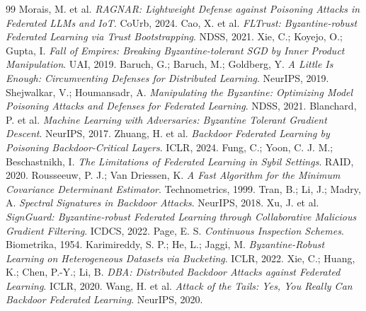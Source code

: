 \documentclass[11pt,a4paper]{article}
\begin{document}
\begin{thebibliography}{99}
 Morais, M. et al. \textit{RAGNAR: Lightweight Defense against Poisoning Attacks in Federated LLMs and IoT}. CoUrb, 2024.
 Cao, X. et al. \textit{FLTrust: Byzantine-robust Federated Learning via Trust Bootstrapping}. NDSS, 2021.
 Xie, C.; Koyejo, O.; Gupta, I. \textit{Fall of Empires: Breaking Byzantine-tolerant SGD by Inner Product Manipulation}. UAI, 2019.
 Baruch, G.; Baruch, M.; Goldberg, Y. \textit{A Little Is Enough: Circumventing Defenses for Distributed Learning}. NeurIPS, 2019.
 Shejwalkar, V.; Houmansadr, A. \textit{Manipulating the Byzantine: Optimizing Model Poisoning Attacks and Defenses for Federated Learning}. NDSS, 2021.
 Blanchard, P. et al. \textit{Machine Learning with Adversaries: Byzantine Tolerant Gradient Descent}. NeurIPS, 2017.
 Zhuang, H. et al. \textit{Backdoor Federated Learning by Poisoning Backdoor-Critical Layers}. ICLR, 2024.
 Fung, C.; Yoon, C. J. M.; Beschastnikh, I. \textit{The Limitations of Federated Learning in Sybil Settings}. RAID, 2020.
 Rousseeuw, P. J.; Van Driessen, K. \textit{A Fast Algorithm for the Minimum Covariance Determinant Estimator}. Technometrics, 1999.
 Tran, B.; Li, J.; Madry, A. \textit{Spectral Signatures in Backdoor Attacks}. NeurIPS, 2018.
 Xu, J. et al. \textit{SignGuard: Byzantine-robust Federated Learning through Collaborative Malicious Gradient Filtering}. ICDCS, 2022.
 Page, E. S. \textit{Continuous Inspection Schemes}. Biometrika, 1954.
 Karimireddy, S. P.; He, L.; Jaggi, M. \textit{Byzantine-Robust Learning on Heterogeneous Datasets via Bucketing}. ICLR, 2022.
 Xie, C.; Huang, K.; Chen, P.-Y.; Li, B. \textit{DBA: Distributed Backdoor Attacks against Federated Learning}. ICLR, 2020.
 Wang, H. et al. \textit{Attack of the Tails: Yes, You Really Can Backdoor Federated Learning}. NeurIPS, 2020.
\end{thebibliography}
\end{document}
